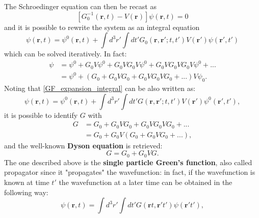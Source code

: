 \documentclass[12pt, a4paper]{report}
\numberwithin{equation}{section}
\begin{document}
The Schroedinger equation can then be recast as
\begin{equation}
    \left[G^{-1}_0(\mathbf{r},t)-V(\mathbf{r})\right]\psi(\mathbf{r},t)=0
\end{equation}
and it is possible to rewrite the system as an integral equation
\begin{equation}
    \psi(\mathbf{r},t)=\psi^0(\mathbf{r},t)+\int d^3r'\int dt' G_0(\mathbf{r},\mathbf{r}';t,t')V(\mathbf{r}')\psi(\mathbf{r}',t')
    \label{GF_expansion_integral}
\end{equation}
which can be solved iteratively. In fact:
\begin{equation}
\begin{split}
    \psi&= \psi^0+G_0V\psi^0+G_0VG_0V\psi^0+G_0VG_0VG_0V\psi^0+...\\
    &= \psi^0+(G_0+G_0VG_0+G_0VG_0VG_0+...)V\psi_0.
\end{split}
\label{expansion_G}
\end{equation}
Noting that \ref{GF_expansion_integral} can be also written as:
\begin{equation}
    \psi(\mathbf{r},t)=\psi^0(\mathbf{r},t)+\int d^3r'\int dt' G(\mathbf{r},\mathbf{r}';t,t')V(\mathbf{r}')\psi^0(\mathbf{r}',t'),
\end{equation}
it is possible to identify $G$ with
\begin{equation}
\begin{split}
    G&=G_0+G_0VG_0+G_0VG_0VG_0+...\\
    &=G_0+G_0V(G_0+G_0VG_0+...),
\end{split}
\end{equation}
and the well-known \textbf{Dyson equation} is retrieved:
\begin{equation}
    G=G_0+G_0VG.
    \label{Dyson_Eq}
\end{equation}
The one described above is the \textbf{single particle Green's function}, also called propagator since it "propagates" the wavefunction: in fact,
if the wavefunction is known at time $t'$ the wavefunction at a later time can be obtained in the following way:
\begin{equation}
    \psi(\mathbf{r},t)=\int d^3r'\int dt' G(\mathbf{r}t,\mathbf{r}'t')\psi(\mathbf{r}'t'),
\end{equation}
\end{document}
